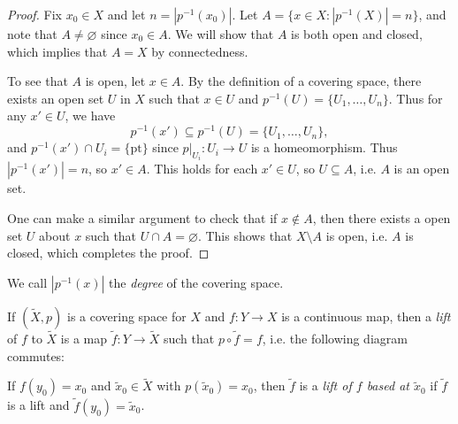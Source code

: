 \begin{proof}
  Fix $x_0 \in X$ and let $n = |p^{-1}(x_0)|$. Let
  $A = \{x \in X : |p^{-1}(X)| = n\}$, and note that
  $A \ne \varnothing$ since $x_0 \in A$. We will
  show that $A$ is both open and closed, which
  implies that $A = X$ by connectedness.

  To see that $A$ is open, let $x \in A$.
  By the definition of a covering space, there exists
  an open set $U$ in $X$ such that $x \in U$ and
  $p^{-1}(U) = \{U_1, \dots, U_n\}$. Thus for
  any $x' \in U$, we have
  \[p^{-1}(x') \subseteq p^{-1}(U) = \{U_1, \dots, U_n\},\]
  and $p^{-1}(x') \cap U_i = \{\text{pt}\}$ since
  $p|_{U_i} : U_i \to U$ is a homeomorphism.
  Thus $|p^{-1}(x')| = n$, so $x' \in A$. This holds
  for each $x' \in U$, so $U \subseteq A$, i.e. $A$
  is an open set.

  One can make a similar argument to check that
  if $x \notin A$, then there exists a open set $U$ about
  $x$ such that $U \cap A = \varnothing$.
  This shows that $X \setminus A$ is open, i.e.
  $A$ is closed, which completes the proof.
\end{proof}

\begin{definition}
  We call $|p^{-1}(x)|$ the \emph{degree} of the
  covering space.
\end{definition}

\begin{definition}
  If $(\widetilde{X}, p)$ is a covering space
  for $X$ and $f : Y \to X$ is a continuous map,
  then a \emph{lift} of $f$ to $\widetilde{X}$ is
  a map $\widetilde{f} : Y \to \widetilde{X}$
  such that $p \circ \widetilde{f} = f$, i.e.
  the following diagram commutes:
  \begin{center}
  \end{center}
  If $f(y_0) = x_0$ and $\widetilde{x}_0 \in \widetilde{X}$
  with $p(\widetilde{x}_0) = x_0$, then
  $\widetilde{f}$ is a \emph{lift of $f$ based at
  $\widetilde{x}_0$} if $\widetilde{f}$ is a lift
  and $\widetilde{f}(y_0) = \widetilde{x}_0$.
\end{definition}

